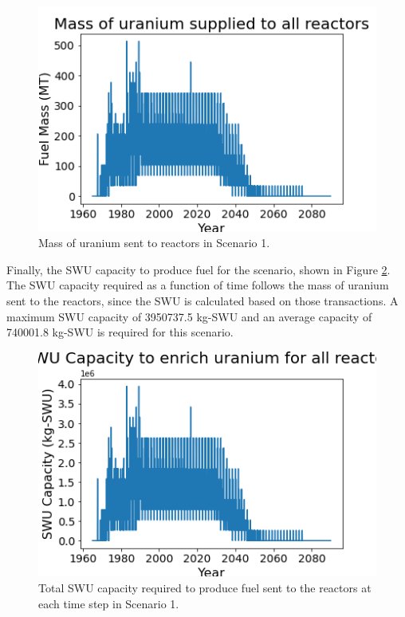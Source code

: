 \begin{figure}
    \centering 
    \includegraphics[scale=0.5]{figures/fuelsupply_scenarios_1.png}
    \caption{Mass of uranium sent to reactors in Scenario 1.}
    \label{fig:fuel_1}
\end{figure}

Finally, the \gls{SWU} capacity to produce fuel for the scenario, shown in 
Figure \ref{fig:swu_1}. The \gls{SWU} capacity required as a function of 
time follows the mass of uranium sent to the reactors, since the \gls{SWU}
is calculated based on those transactions. A maximum \gls{SWU} capacity of 
3950737.5 kg-\gls{SWU} and an average capacity of 740001.8 kg-\gls{SWU} is 
required for this scenario.

\begin{figure}
    \centering
    \includegraphics[scale=0.5]{figures/totalswu_scenarios_1.png}
    \caption{Total \gls{SWU} capacity required to produce fuel sent to the 
    reactors at each time step in Scenario 1.}
    \label{fig:swu_1}
\end{figure}


